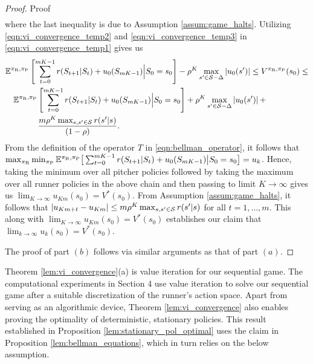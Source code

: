 \documentclass[aoas]{imsart}
\theoremstyle{plain}
\theoremstyle{definition}
\newcommand{\abs}[1]{\left\lvert#1\right\rvert}
\begin{document}
\begin{proof}{Proof}
\begin{align}
           \end{align}
           where the last inequality is due to Assumption \ref{assum:game_halts}. Utilizing \eqref{eqn:vi_convergence_temp2} and \eqref{eqn:vi_convergence_temp3} in \eqref{eqn:vi_convergence_temp1} gives us
           \begin{align*}
           &\mathbb{E}^{\pi_\text{R},\pi_\text{P}}\left[\sum_{t=0}^{mK-1} r(S_{t+1}|S_t) + u_0(S_{mK-1}) \Big| S_0 = s_0\right] -\rho^K \max_{s' \in {\cal S}-\Delta}\abs{u_0(s')} \leq  V^{\pi_\text{R},\pi_\text{P}}(s_0) \leq\\
           &\quad \mathbb{E}^{\pi_\text{R},\pi_\text{P}}\left[\sum_{t=0}^{mK-1} r(S_{t+1}|S_t) + u_0(S_{mK-1}) \Big| S_0 = s_0\right] +\rho^K \max_{s' \in {\cal S}-\Delta}\abs{u_0(s')} + \\
           &\qquad \qquad \frac{m\rho^K\max_{s,s' \in {\cal S}}r(s'|s)}{(1-\rho)}.
           \end{align*}
           From the definition of the operator $T$ in \eqref{eqn:bellman_operator}, it follows that $\max_{\pi_{\text{R}}}\min_{\pi_\text{P}}\mathbb{E}^{\pi_\text{R},\pi_\text{P}}\big[\sum_{t=0}^{mK-1}  \\ r(S_{t+1}|S_t) + u_0(S_{mK-1}) \big| S_0 = s_0\big] = u_k$. Hence, taking the minimum over all pitcher policies followed by taking the maximum over all runner policies in the above chain and then passing to limit $K \to \infty$ gives us $\lim_{K \to \infty}u_{Km}(s_0) = V^*(s_0)$. From Assumption \ref{assum:game_halts}, it follows that $\abs{u_{Km+t} - u_{Km}} \leq m \rho^K \max_{s,s' \in {\cal S}}r(s'|s)$ for all $t=1,\ldots,m$. This along with $\lim_{K \to \infty}u_{Km}(s_0) = V^*(s_0)$ establishes our claim that $\lim_{k \to \infty}u_k(s_0) = V^*(s_0)$.
    
           The proof of part $(b)$ follows via similar arguments as that of part $(a)$.
       \end{proof}
    
    Theorem \ref{lem:vi_convergence}(a) is value iteration for our sequential game. The computational experiments in Section 4 use value iteration to solve our sequential game after a suitable discretization of the runner's action space. Apart from serving as an algorithmic device, Theorem \ref{lem:vi_convergence} also enables proving the optimality of deterministic, stationary policies. This result established in Proposition \ref{lem:stationary_pol_optimal} uses the claim in Proposition \ref{lem:bellman_equations}, which in turn relies on the below assumption.
    
\end{document}
